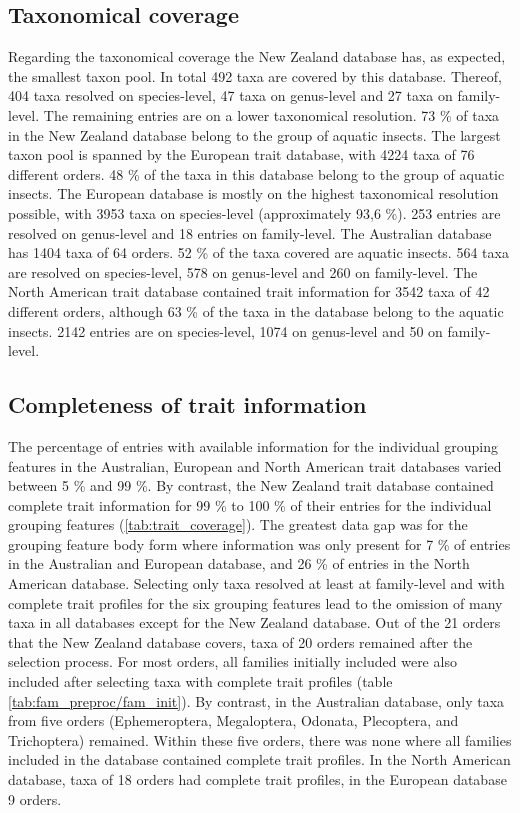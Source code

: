 \documentclass{article}
\begin{document}
\subsection{Taxonomical coverage}
Regarding the taxonomical coverage the New Zealand database has, as expected, the smallest 
taxon pool. In total 492 taxa are covered by this database. Thereof, 404 taxa resolved on species-level, 47 taxa 
on genus-level and 27 taxa on family-level. The remaining entries are on a lower taxonomical resolution. 
73 \% of taxa in the New Zealand database belong to the group of aquatic insects.
The largest taxon pool is spanned by the European trait database, with 4224 taxa of 76 different orders. 
48 \% of the taxa in this database belong to the group of aquatic insects. The European database is 
mostly on the highest taxonomical resolution possible, with 3953 taxa on species-level (approximately 93,6 \%).
253 entries are resolved on genus-level and 18 entries on family-level.
The Australian database has 1404 taxa of 64 orders. 52 \% of the taxa covered are aquatic insects. 
564 taxa are resolved on species-level, 578 on genus-level and 260 on family-level.
The North American trait database contained trait information for 3542 taxa of 42 different orders, 
although 63 \% of the taxa in the database belong to the aquatic insects. 2142 entries are on 
species-level, 1074 on genus-level and 50 on family-level. 

\subsection{Completeness of trait information}
The percentage of entries with available information for the individual grouping features in the Australian, European and
North American trait databases varied between 5 \% and 99 \%. By contrast, the New Zealand trait database
contained complete trait information for 99 \% to 100 \% of their entries for the individual grouping features (\ref{tab:trait_coverage}).
The greatest data gap was for the grouping feature body form where information was only present for 7 \% of entries
in the Australian and European database, and 26 \% of entries in the North American database. %
Selecting only taxa resolved at least at 
family-level and with complete trait profiles for the six grouping features lead to the omission of many taxa in all databases except for the New Zealand database. 
Out of the 21 orders that the New Zealand database covers, taxa of 20 orders remained after the selection process.
For most orders, all families initially included were also included after selecting taxa with complete trait profiles (table \ref{tab:fam_preproc/fam_init}).
By contrast, in the Australian database, only taxa from five orders (Ephemeroptera, Megaloptera, Odonata, Plecoptera, 
and Trichoptera) remained. Within these five orders, there was none where all families included in the database contained complete trait profiles. %
In the North American database, taxa of 18 orders had complete trait profiles, in the European database 9 orders. 
\end{document}
